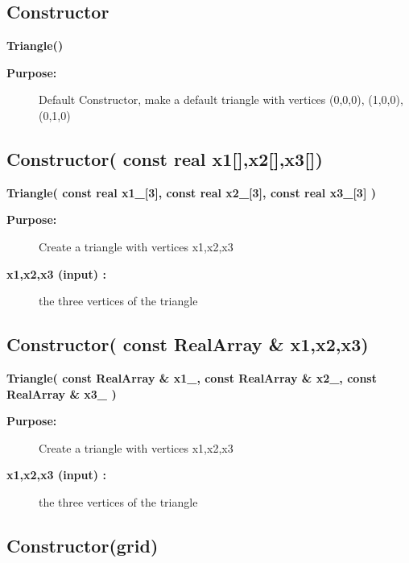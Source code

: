 \subsection{Constructor}
 
\newlength{\TriangleIncludeArgIndent}
\begin{flushleft} \textbf{%
\settowidth{\TriangleIncludeArgIndent}{Triangle(}%
Triangle()
}\end{flushleft}
\begin{description}
\item[{\bf Purpose:}]  Default Constructor, make a default triangle with 
 vertices (0,0,0), (1,0,0), (0,1,0)
\end{description}
\subsection{Constructor( const real x1[],x2[],x3[])}
 
\begin{flushleft} \textbf{%
\settowidth{\TriangleIncludeArgIndent}{Triangle(}%
Triangle( const real x1\_[3], const real x2\_[3], const real x3\_[3] )
}\end{flushleft}
\begin{description}
\item[{\bf Purpose:}]  Create a triangle with vertices x1,x2,x3
\item[{\bf x1,x2,x3 (input) :}]  the three vertices of the triangle
\end{description}
\subsection{Constructor( const RealArray \& x1,x2,x3)}
 
\begin{flushleft} \textbf{%
\settowidth{\TriangleIncludeArgIndent}{Triangle(}%
Triangle( const RealArray \& x1\_, const RealArray \& x2\_, const RealArray \& x3\_ )
}\end{flushleft}
\begin{description}
\item[{\bf Purpose:}]  Create a triangle with vertices x1,x2,x3
\item[{\bf x1,x2,x3 (input) :}]  the three vertices of the triangle
\end{description}
\subsection{Constructor(grid)}
 
